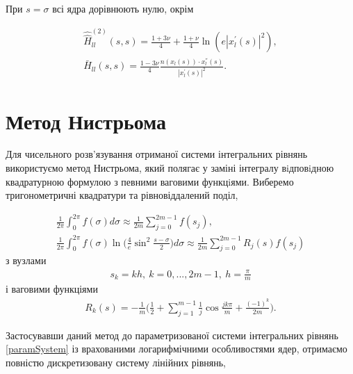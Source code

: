 \documentclass[12pt]{report}
\begin{document}
 При $s=\sigma$ всі ядра дорівнюють нулю, окрім 
 
 \begin{gather*}
	\hat{\hat{H}}^{(2)}_{ll}(s, s) = \frac{1+3\nu}{4}+\frac{1+\nu}{4}\ln(e|x_l^{'}(s)|^2), \\
	\bar{H}_{ll}(s,s)=\frac{1-3\nu}{4}\frac{n(x_l(s))\cdot x_l^{''}(s)}{|x_l^{'}(s)|^2}.
 \end{gather*}
 
\section{Метод Нистрьома}

Для чисельного розв'язування отриманої системи інтегральних рівнянь використуємо метод Нистрьома, який полягає у заміні інтегралу вiдповiдною квадратурною формулою з певними ваговими функцiями. Виберемо тригонометричні квадратури та рівновіддалений поділ,

\begin{gather}
 	\frac{1}{2\pi}\int_{0}^{2\pi}f(\sigma)d\sigma\approx\frac{1}{2m}\sum_{j=0}^{2m-1}f(s_j), \\
	\frac{1}{2\pi}\int_{0}^{2\pi}f(\sigma)\ln\bigg(\frac{4}{e}\sin^2\frac{s-\sigma}{2}\bigg)d\sigma\approx\frac{1}{2m}\sum_{j=0}^{2m-1}R_j(s)f(s_j)
 \end{gather}
 з вузлами
 \begin{gather}
 	s_k=kh, \ k=0,...,2m-1, \ h=\frac{\pi}{m}
  \end{gather}
  і ваговими функціями
  \begin{gather}
 	R_k(s)=-\frac{1}{m}\bigg(\frac{1}{2}+\sum_{j=1}^{m-1}\frac{1}{j}\cos \frac{jk\pi}{m}+ \frac{(-1)^k}{2m}\bigg).
  \end{gather}

Застосувавши даний метод до параметризованої системи інтегральних рівнянь \eqref{paramSystem} із врахованими логарифмічними особливостями ядер, отримаємо повністю дискретизовану систему лінійних рівнянь,
\end{document}
